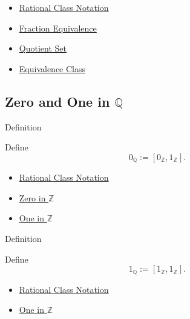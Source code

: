 \begin{dependencies}
\begin{itemize}
  \item \hyperref[def:rational-class-notation]{Rational Class Notation}
  \item \hyperref[def:fraction-equivalence]{Fraction Equivalence}
  \item \hyperref[def:quotient-set]{Quotient Set}
  \item \hyperref[def:equiv-class]{Equivalence Class}
\end{itemize}
\end{dependencies}

\subsection*{Zero and One in $\mathbb{Q}$}

\begin{definitionbox}{Definition}
\begin{definition}
\label{def:zero-in-q}
Define
\[
0_{\mathbb{Q}}:=[0_{\mathbb{Z}},1_{\mathbb{Z}}].
\]
\end{definition}
\end{definitionbox}

\begin{dependencies}
\begin{itemize}
  \item \hyperref[def:rational-class-notation]{Rational Class Notation}
  \item \hyperref[def:zero-in-z]{Zero in $\mathbb{Z}$}
  \item \hyperref[def:one-in-z]{One in $\mathbb{Z}$}
\end{itemize}
\end{dependencies}

\begin{definitionbox}{Definition}
\begin{definition}
\label{def:one-in-q}
Define
\[
1_{\mathbb{Q}}:=[1_{\mathbb{Z}},1_{\mathbb{Z}}].
\]
\end{definition}
\end{definitionbox}

\begin{dependencies}
\begin{itemize}
  \item \hyperref[def:rational-class-notation]{Rational Class Notation}
  \item \hyperref[def:one-in-z]{One in $\mathbb{Z}$}
\end{itemize}
\end{dependencies}

